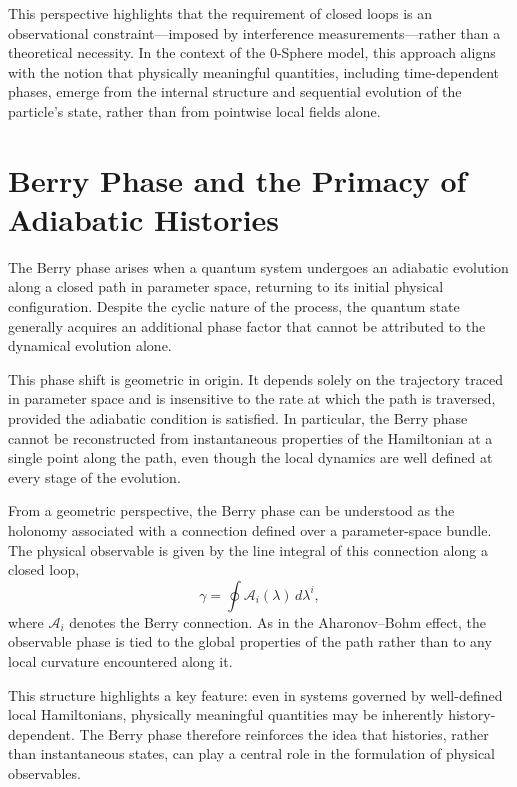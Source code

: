 \documentclass[%
 reprint,
 amsmath,amssymb,
 aps,
 prb,
]{revtex4-2}
\numberwithin{equation}{section}
\begin{document}
This perspective highlights that the requirement of closed loops is an observational constraint—imposed by interference measurements—rather than a theoretical necessity. In the context of the 0-Sphere model, this approach aligns with the notion that physically meaningful quantities, including time-dependent phases, emerge from the internal structure and sequential evolution of the particle's state, rather than from pointwise local fields alone.



\section{Berry Phase and the Primacy of Adiabatic Histories}
\label{sec:berry_phase_histories}

The Berry phase arises when a quantum system undergoes an adiabatic evolution along a closed path in parameter space, returning to its initial physical configuration. Despite the cyclic nature of the process, the quantum state generally acquires an additional phase factor that cannot be attributed to the dynamical evolution alone.

This phase shift is geometric in origin. It depends solely on the trajectory traced in parameter space and is insensitive to the rate at which the path is traversed, provided the adiabatic condition is satisfied. In particular, the Berry phase cannot be reconstructed from instantaneous properties of the Hamiltonian at a single point along the path, even though the local dynamics are well defined at every stage of the evolution.

From a geometric perspective, the Berry phase can be understood as the holonomy associated with a connection defined over a parameter-space bundle. The physical observable is given by the line integral of this connection along a closed loop,
\begin{equation}
\gamma = \oint \mathcal{A}_i(\lambda) \, d\lambda^i,
\end{equation}
where $\mathcal{A}_i$ denotes the Berry connection. As in the Aharonov--Bohm effect, the observable phase is tied to the global properties of the path rather than to any local curvature encountered along it.

This structure highlights a key feature: even in systems governed by well-defined local Hamiltonians, physically meaningful quantities may be inherently history-dependent. The Berry phase therefore reinforces the idea that histories, rather than instantaneous states, can play a central role in the formulation of physical observables.
\end{document}
